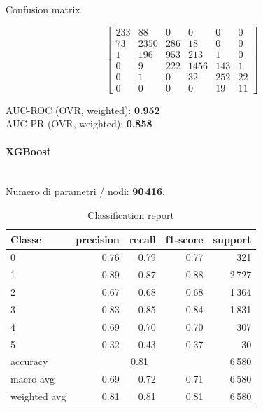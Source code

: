 \documentclass[a4paper,12pt]{report}
\begin{document}
	\begin{table}[H]
		\centering
		\caption{Confusion matrix}
		\label{tab:cm_rf}
		\[
		\begin{bmatrix}
			233 & 88  & 0   & 0   & 0   & 0   \\
			73  & 2350& 286 & 18  & 0   & 0   \\
			1   & 196 & 953 & 213 & 1   & 0   \\
			0   & 9   & 222 & 1456& 143 & 1   \\
			0   & 1   & 0   & 32  & 252 & 22  \\
			0   & 0   & 0   & 0   & 19  & 11
		\end{bmatrix}
		\]
		\vspace{1mm}
		
		AUC-ROC (OVR, weighted): \textbf{0.952} \\
		AUC-PR  (OVR, weighted): \textbf{0.858}
	\end{table}
	
	
	\paragraph{XGBoost} \mbox{}\\
	Numero di parametri / nodi: \textbf{90\,416}.
	
	\begin{table}[H]
		\centering
		\caption{Classification report}
		\label{tab:cr_xgb}
		\begin{tabular}{lrrrr}
			\toprule
			Classe & precision & recall & f1-score & support \\
			\midrule
			0 & 0.76 & 0.79 & 0.77 & 321 \\
			1 & 0.89 & 0.87 & 0.88 & 2\,727 \\
			2 & 0.67 & 0.68 & 0.68 & 1\,364 \\
			3 & 0.83 & 0.85 & 0.84 & 1\,831 \\
			4 & 0.69 & 0.70 & 0.70 & 307 \\
			5 & 0.32 & 0.43 & 0.37 & 30 \\
			\midrule
			accuracy & \multicolumn{3}{c}{0.81} & 6\,580 \\
			macro avg & 0.69 & 0.72 & 0.71 & 6\,580 \\
			weighted avg & 0.81 & 0.81 & 0.81 & 6\,580 \\
			\bottomrule
		\end{tabular}
	\end{table}
	
\end{document}
